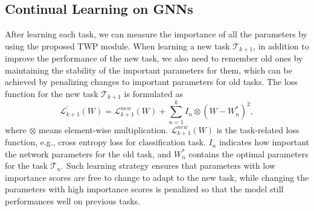 \documentclass[letterpaper]{article} %
\begin{document}
\subsection{Continual Learning on GNNs}
After learning each task, we can measure the 
importance of all the parameters 
by using the proposed TWP module. 
When learning a new task $\mathcal{T}_{k+1}$, 
in addition to improve the performance of
the new task, 
we also need to remember old ones 
by maintaining the stability of 
the important parameters for them, which can be achieved 
by penalizing changes to important parameters for old tasks.
The loss function for the new task $\mathcal{T}_{k+1}$ is
formulated as
\begin{equation}
\label{loss2}
  \mathcal{L}^{'}_{k+1}(W) = \mathcal{L}_{k+1}^{new}(W) +  \sum_{n=1}^{k} I_n \otimes (W - W^*_{n})^{2},
\end{equation}
\noindent where $\otimes$ means element-wise multiplication. 
$\mathcal{L}_{k+1}^{new}(W)$ is the 
task-related loss function, 
e.g., cross entropy 
loss for classification task.
$I_n$ indicates how important the network parameters 
for the old task, 
and $W_n^*$ contains the optimal parameters for 
the task $\mathcal{T}_n$.
Such learning strategy ensures that parameters with low importance scores 
are free to change to adapt to the new task, 
while changing the parameters with high importance scores is penalized
so that the model still performances well on  previous tasks.
\end{document}
